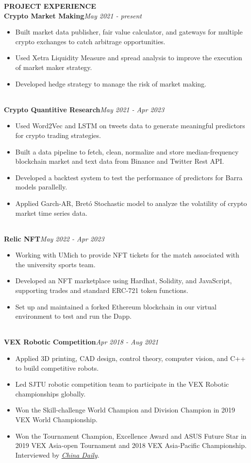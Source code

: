 \documentclass[10pt,a4paper]{article}
\begin{document}
\rlap{\rule[-1mm]{\linewidth}{.5mm}}\textbf{\large{PROJECT EXPERIENCE}}\\
\textbf{Crypto Market Making}\hfill \emph{May 2021 - present}
\begin{itemize}[noitemsep,topsep=0pt]
    \item Built market data publisher, fair value calculator, and gateways for multiple crypto exchanges to catch arbitrage opportunities.
    \item Used Xetra Liquidity Measure and spread analysis to improve the execution of market maker strategy.
    \item Developed hedge strategy to manage the risk of market making.
\end{itemize}
\noindent\\
\textbf{Crypto Quantitive Research}\hfill \emph{May 2021 - Apr 2023}
\begin{itemize}[noitemsep,topsep=0pt]
    \item Used Word2Vec and LSTM on tweets data to generate meaningful predictors for crypto trading strategies.
    \item Built a data pipeline to fetch, clean, normalize and store median-frequency blockchain market and text data from Binance and Twitter Rest API.
    \item Developed a backtest system to test the performance of predictors for Barra models parallelly.
    \item Applied Garch-AR, Bretó Stochastic model to analyze the volatility of crypto market time series data.
\end{itemize}
\noindent\\
\textbf{Relic NFT}\hfill\emph{May 2022 - Apr 2023}
\begin{itemize}[noitemsep,topsep=0pt]
    \item Working with UMich to provide NFT tickets for the match associated with the university sports team.
    \item Developed an NFT marketplace using Hardhat, Solidity, and JavaScript, supporting trades and standard ERC-721 token functions.
    \item Set up and maintained a forked Ethereum blockchain in our virtual environment to test and run the Dapp.
\end{itemize}
\noindent\\
\textbf{VEX Robotic Competition}\hfill\emph{Apr 2018 - Aug 2021}
\begin{itemize}[noitemsep,topsep=0pt]
    \item Applied 3D printing, CAD design, control theory, computer vision, and C++ to build competitive robots.
    \item Led SJTU robotic competition team to participate in the VEX Robotic championships globally. 
    \item Won the Skill-challenge World Champion and Division Champion in 2019 VEX World Championship.
    \item Won the Tournament Champion, Excellence Award and ASUS Future Star in 2019 VEX Asia-open Tournament and 2018 VEX Asia-Pacific Championship. Interviewed by \href{https://www.chinadaily.com.cn/a/201902/25/WS5c73ea69a3106c65c34eb502.html}{\emph{China Daily}}.
\end{itemize}
\end{document}
